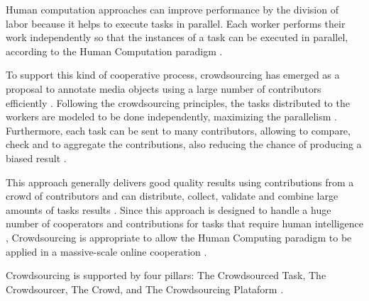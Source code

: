 Human computation approaches can improve performance by the division of labor because it helps to execute tasks in parallel. Each worker performs their work independently so that the instances of a task can be executed in parallel, according to the Human Computation paradigm \cite{Rohwer:2010:NHC:1837885.1837897}.

To support this kind of cooperative process, crowdsourcing has emerged as a proposal to annotate media objects using a large number of contributors efficiently \cite{VonAhn:2005:HC:1168246}. Following the crowdsourcing principles, the tasks distributed to the workers are modeled to be done independently, maximizing the parallelism \citep{Howe2006}. Furthermore, each task can be sent to many contributors, allowing to compare, check and to aggregate the contributions, also reducing the chance of producing a biased result  \cite{GALTON1907}.

This approach generally delivers good quality results using contributions from a crowd of contributors and can distribute, collect, validate and combine large amounts of tasks results \cite{Hong:2011:GCR:2018966.2018970,Haas:2015:AMC:2824032.2824062,Mo:2013:OPH:2505515.2505755}. Since this approach is designed to handle a huge number of cooperators and contributions for tasks that require human intelligence \cite{Howe2006}, Crowdsourcing is appropriate to allow the Human Computing paradigm to be applied in a massive-scale online cooperation \cite{TEDMassive}.

Crowdsourcing  is supported by four pillars:  The Crowdsourced Task, The Crowdsourcer, The Crowd, and The Crowdsourcing Plataform \cite{6861072}.

